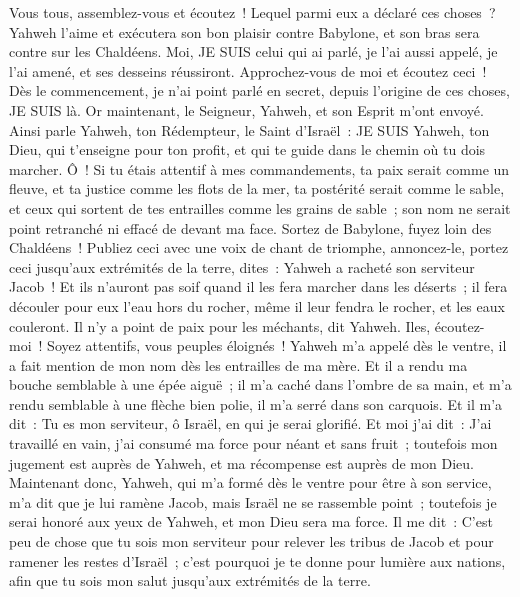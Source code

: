\begin{multicols}{2}
Vous tous, assemblez-vous et écoutez~! Lequel parmi eux a déclaré ces choses~? Yahweh l'aime et exécutera son bon plaisir contre Babylone, et son bras sera contre sur les Chaldéens.
Moi, JE SUIS celui qui ai parlé, je l'ai aussi appelé, je l'ai amené, et ses desseins réussiront.
Approchez-vous de moi et écoutez ceci~! Dès le commencement, je n'ai point parlé en secret, depuis l'origine de ces choses, JE SUIS là. Or maintenant, le Seigneur, Yahweh, et son Esprit m'ont envoyé.
Ainsi parle Yahweh, ton Rédempteur, le Saint d'Israël~: JE SUIS Yahweh, ton Dieu, qui t'enseigne pour ton profit, et qui te guide dans le chemin où tu dois marcher.
Ô~! Si tu étais attentif à mes commandements, ta paix serait comme un fleuve, et ta justice comme les flots de la mer,
ta postérité serait comme le sable, et ceux qui sortent de tes entrailles comme les grains de sable~; son nom ne serait point retranché ni effacé de devant ma face.
Sortez de Babylone, fuyez loin des Chaldéens~! Publiez ceci avec une voix de chant de triomphe, annoncez-le, portez ceci jusqu'aux extrémités de la terre, dites~: Yahweh a racheté son serviteur Jacob~!
Et ils n'auront pas soif quand il les fera marcher dans les déserts~; il fera découler pour eux l'eau hors du rocher, même il leur fendra le rocher, et les eaux couleront.
Il n'y a point de paix pour les méchants, dit Yahweh.
\VerseOne{}Iles, écoutez-moi~! Soyez attentifs, vous peuples éloignés~! Yahweh m'a appelé dès le ventre, il a fait mention de mon nom dès les entrailles de ma mère.
Et il a rendu ma bouche semblable à une épée aiguë~; il m'a caché dans l'ombre de sa main, et m'a rendu semblable à une flèche bien polie, il m'a serré dans son carquois.
Et il m'a dit~: Tu es mon serviteur, ô Israël, en qui je serai glorifié.
Et moi j'ai dit~: J'ai travaillé en vain, j'ai consumé ma force pour néant et sans fruit~; toutefois mon jugement est auprès de Yahweh, et ma récompense est auprès de mon Dieu.
Maintenant donc, Yahweh, qui m'a formé dès le ventre pour être à son service, m'a dit que je lui ramène Jacob, mais Israël ne se rassemble point~; toutefois je serai honoré aux yeux de Yahweh, et mon Dieu sera ma force.
Il me dit~: C'est peu de chose que tu sois mon serviteur pour relever les tribus de Jacob et pour ramener les restes d'Israël~; c'est pourquoi je te donne pour lumière aux nations, afin que tu sois mon salut jusqu'aux extrémités de la terre.

\end{multicols}

